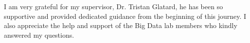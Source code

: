\begin{acknowledgments}

I am very grateful for my supervisor, Dr. Tristan Glatard, he has been so supportive and provided dedicated guidance from the beginning of this journey. I also appreciate the help and support of the Big Data lab members who kindly answered my questions.




\end{acknowledgments}

